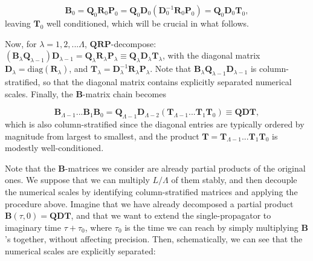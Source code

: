 \begin{equation}
\bm B_0 = \bm Q_0 \bm R_0 \bm P_0 = \bm Q_0 \bm D_0 ( \bm D_0^{-1} \bm R_0 \bm P_0 ) = \bm Q_0 \bm D_0 \bm T_0 ,
\end{equation}
leaving $\bm T_0$ well conditioned, which will be crucial in what follows.

Now, for $\lambda = 1, 2, ... \Lambda$, $\bm Q \bm R \bm P$-decompose: $(\bm B_\lambda \bm Q_{\lambda-1}) \bm D_{\lambda-1} = \bm Q_\lambda \bm R_\lambda \bm P_\lambda \equiv \bm Q_\lambda \bm D_\lambda \bm T_\lambda$, with the diagonal matrix $\bm D_\lambda = \text{diag} ( \bm R_\lambda ) $, and $\bm T_\lambda = \bm D_\lambda^{-1} \bm R_\lambda \bm P_\lambda$.
Note that $\bm B_\lambda \bm Q_{\lambda-1} \bm D_{\lambda-1}$ is column-stratified, so that the diagonal matrix contains explicitly separated numerical scales.
Finally, the $\bm B$-matrix chain becomes

\begin{equation}
\bm B_{\Lambda - 1} ... \bm B_1 \bm B_0 = \bm Q_{\Lambda - 1} \bm D_{\Lambda -2 } ( \bm T_{\Lambda-1} ... \bm T_1 \bm T_0 ) \equiv \bm Q \bm D \bm T ,
\end{equation}
which is also column-stratified since the diagonal entries are typically ordered by magnitude from largest to smallest, and the product $\bm T = \bm T_{\Lambda-1} ... \bm T_1 \bm T_0$ is modestly well-conditioned.

Note that the $\bm B$-matrices we consider are already partial products of the original ones.
We suppose that we can multiply $L / \Lambda $ of them stably, and then decouple the numerical scales by identifying column-stratified matrices and applying the procedure above.
Imagine that we have already decomposed a partial product $\bm B ( \tau, 0 ) = \bm Q \bm D \bm T$, and that we want to extend the single-propagator to imaginary time $\tau + \tau_0$, where $\tau_0$ is the time we can reach by simply multiplying $\bm B$'s together, without affecting precision.
Then, schematically, we can see that the numerical scales are explicitly separated:

